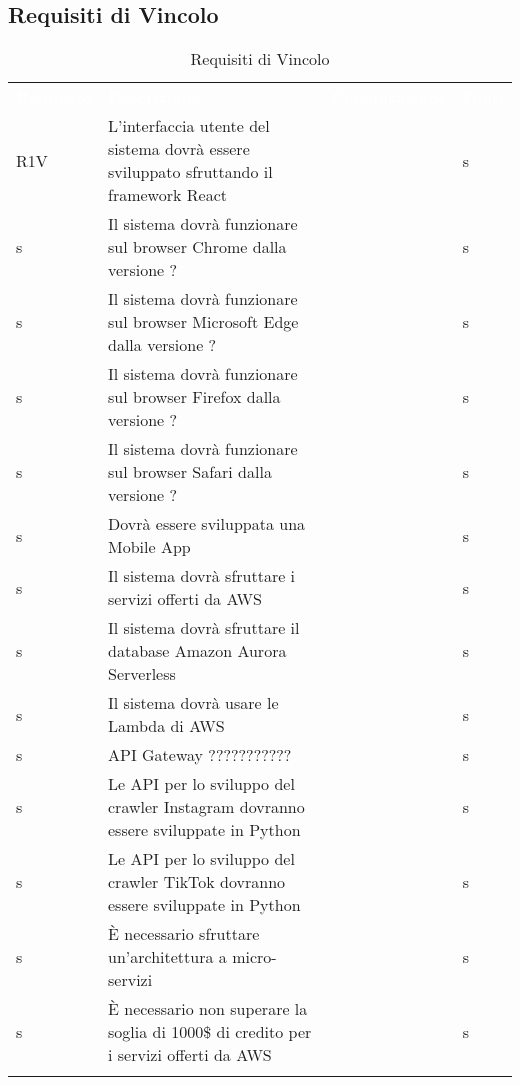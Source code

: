 \subsection{Requisiti di Vincolo}


\renewcommand{\arraystretch}{1.5}
\begin{longtable}{ m{}<{\centering}  m{}<{\centering}  m{}<{\centering}  m{}<{\centering}}
	\rowcolor{darkblue}
	\textcolor{white}{\textbf{Requisito}} &\textcolor{white}{\textbf{Descrizione}}& \textcolor{white}{\textbf{Classificazione}} & \textcolor{white}{\textbf{Fonti}}\\ 

	R1V & L’interfaccia utente del sistema dovrà essere sviluppato sfruttando il framework React & \Ob & s\\	

	s & Il sistema dovrà funzionare sul browser Chrome dalla versione ? & \Ob & s\\	
	 
	s & Il sistema dovrà funzionare sul browser Microsoft Edge dalla versione ? & \Ob & s\\	

	s & Il sistema dovrà funzionare sul browser Firefox dalla versione ? & \Ob & s\\	
	 
	s & Il sistema dovrà funzionare sul browser Safari dalla versione ? & \Ob & s\\	
	 
	s & Dovrà essere sviluppata una Mobile App & \Fa & s\\	
	 
	s & Il sistema dovrà sfruttare i servizi offerti da AWS & \Ob & s\\	
	 
	s & Il sistema dovrà sfruttare il database Amazon Aurora Serverless & \De & s\\
	
	s & Il sistema dovrà usare le Lambda di AWS & \Ob & s\\	
	 
	s & API Gateway ??????????? & \De & s\\	 

	s & Le API per lo sviluppo del crawler Instagram dovranno essere sviluppate in Python & \De & s\\	
	 
	s & Le API per lo sviluppo del crawler TikTok dovranno essere sviluppate in Python & \De & s\\	
	 
	s & È necessario sfruttare un’architettura a micro-servizi & \Ob & s\\	
	 
	s & È necessario non superare la soglia di 1000\$ di credito per i servizi offerti da AWS & \Ob & s\\	
	
	\caption{Requisiti di Vincolo}
\end{longtable}

\pagebreak